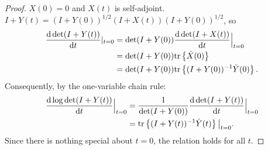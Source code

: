 \documentclass{amsart}
\numberwithin{equation}{section}
\begin{document}
\begin{proof}
  $X(0) = 0$ and $X(t)$ is self-adjoint.
  $I+Y(t) = (I+Y(0))^{1/2}(I+X(t))(I+Y(0))^{1/2}$, so
  \begin{align*}
    \frac{\text{\textup{d}} \det (I+Y(t))}{\text{\textup{d}} t}|_{t=0} 
    &= \det (I+Y(0))\frac{\text{\textup{d}} \det (I+X(t))}{\text{\textup{d}} t}\Big |_{t=0} \\
    &= \det (I+Y(0)) \textup{tr}\left \{\dot{X}(0) \right \} \\
    &= \det (I+Y(0)) \textup{tr}\left \{(I+Y(0))^{-1} \dot{Y}(0) \right \}.
  \end{align*}
  Consequently, by the one-variable chain rule:
  \begin{align*}
    \frac{\text{\textup{d}} \log \det (I+Y(t))}{\text{\textup{d}} t}\Big |_{t=0} &=
    \frac{1}{\det (I+Y(0))}\frac{\text{\textup{d}} \det (I+Y(t))}{\text{\textup{d}} t}\Big |_{t=0} \\ 
    &= \textup{tr}\left \{ (I+Y(t))^{-1} \dot{Y}(t) \right \} \big |_{t=0}.
  \end{align*}
  Since there is nothing special about $t=0$, the relation holds for all $t$.
\end{proof}
\end{document}
